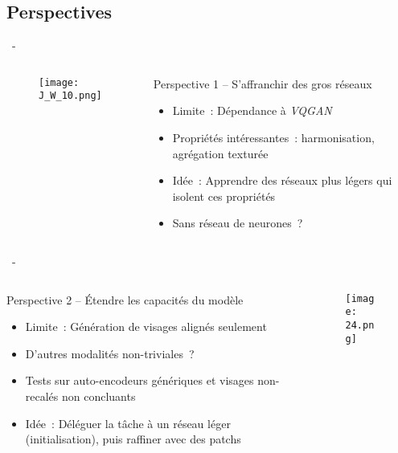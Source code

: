\documentclass[aspectratio=169, 22pt]{beamer}
\begin{document}
\subsection{Perspectives}
\begin{frame}{\secname~- \subsecname}
  \begin{columns}
    \begin{column}{0.5\linewidth}
      \begin{figure}
        \centering
        \texttt{[image: J\_W\_10.png]}
      \end{figure}
    \end{column}
    \begin{column}{0.5\linewidth}
      \begin{block}{Perspective 1 – S'affranchir des gros réseaux}
        \begin{itemize}
        \item \alert{Limite} : Dépendance à \emph{VQGAN}
        \item Propriétés intéressantes : harmonisation, agrégation texturée

        \item \alert{Idée} : Apprendre des réseaux plus légers qui isolent ces propriétés
        \item Sans réseau de neurones ?
        \end{itemize}

      \end{block}
    \end{column}
  \end{columns}
\end{frame}

\begin{frame}{\secname~- \subsecname}
  \begin{columns}
    \begin{column}{0.6\linewidth}
      \begin{block}{Perspective 2 – Étendre les capacités du modèle}        
        \begin{itemize}
        \item \alert{Limite} : Génération de visages alignés seulement
        \item D'autres modalités non-triviales ?

        \item Tests sur auto-encodeurs génériques et visages non-recalés non concluants
        \item \alert{Idée} : Déléguer la tâche à un réseau léger
          (initialisation), puis raffiner avec des patchs
        \end{itemize}
      \end{block}
    \end{column}
    \begin{column}{0.4\linewidth}
      \begin{figure}
        \centering
        \texttt{[image: 24.png]}
      \end{figure}
    \end{column}
  \end{columns}
\end{frame}
\end{document}
